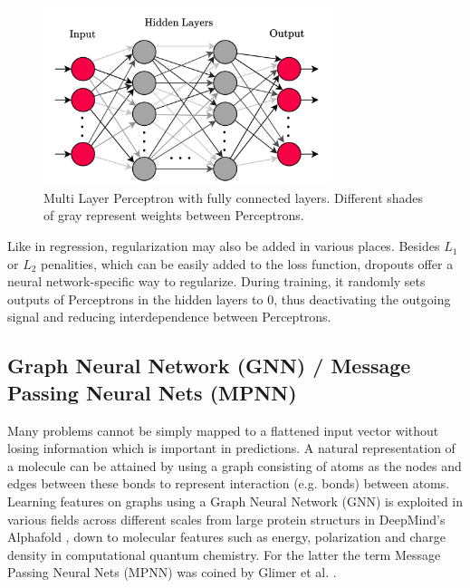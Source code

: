 \begin{figure}[h]
    \centering
    \includegraphics[width=0.75\textwidth]{../fig/background/MLP.pdf}
    \caption[Multi Layer Perceptron]{Multi Layer Perceptron with fully connected layers. Different shades of gray represent weights between Perceptrons.}
    \label{fig:mlp}
\end{figure}

Like in regression, regularization may also be added in various places. Besides $L_1$ or $L_2$ penalities, which can be easily added to the loss function, dropouts offer a neural network-specific way to regularize. During training, it randomly sets outputs of Perceptrons in the hidden layers to 0, thus deactivating the outgoing signal and reducing interdependence between Perceptrons. 

\subsection{Graph Neural Network (GNN) / Message Passing Neural Nets (MPNN)}
\label{subsec:background_gnn}
Many problems cannot be simply mapped to a flattened input vector without losing information which is important in predictions. A natural representation of a molecule can be attained by using a graph consisting of atoms as the nodes and edges between these bonds to represent interaction (e.g. bonds) between atoms. Learning features on graphs using a Graph Neural Network (GNN) is exploited in various fields across different scales from large protein structurs in DeepMind's Alphafold \parencite{ref:alphafold}, down to molecular features such as energy, polarization and charge density in computational quantum chemistry. For the latter the term Message Passing Neural Nets (MPNN) was coined by Glimer et al. \parencite{ref:gilmer2017neural}.\\

